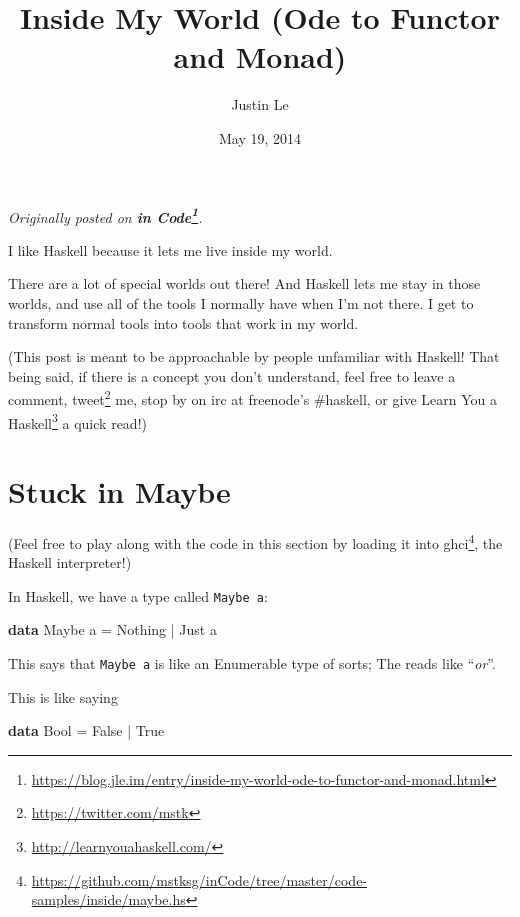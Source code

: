 \documentclass[]{article}
\title{Inside My World (Ode to Functor and Monad)}
\author{Justin Le}
\date{May 19, 2014}
\newenvironment{Shaded}{}{}
\newcommand{\KeywordTok}[1]{\textcolor[rgb]{0.00,0.44,0.13}{\textbf{{#1}}}}
\newcommand{\DataTypeTok}[1]{\textcolor[rgb]{0.56,0.13,0.00}{{#1}}}
\newcommand{\FunctionTok}[1]{\textcolor[rgb]{0.02,0.16,0.49}{{#1}}}
\newcommand{\NormalTok}[1]{{#1}}
\renewcommand{\href}[2]{#2\footnote{\url{#1}}}
\begin{document}
\maketitle

\emph{Originally posted on
\textbf{\href{https://blog.jle.im/entry/inside-my-world-ode-to-functor-and-monad.html}{in
Code}}.}

I like Haskell because it lets me live inside my world.

There are a lot of special worlds out there! And Haskell lets me stay in
those worlds, and use all of the tools I normally have when I'm not
there. I get to transform normal tools into tools that work in my world.

(This post is meant to be approachable by people unfamiliar with
Haskell! That being said, if there is a concept you don't understand,
feel free to leave a comment, \href{https://twitter.com/mstk}{tweet} me,
stop by on irc at freenode's \#haskell, or give
\href{http://learnyouahaskell.com/}{Learn You a Haskell} a quick read!)

\section{Stuck in Maybe}\label{stuck-in-maybe}

(Feel free to play along with the code in this section by
\href{https://github.com/mstksg/inCode/tree/master/code-samples/inside/maybe.hs}{loading
it into ghci}, the Haskell interpreter!)

In Haskell, we have a type called \texttt{Maybe\ a}:

\begin{Shaded}
\begin{Highlighting}[]
\KeywordTok{data} \DataTypeTok{Maybe} \NormalTok{a }\FunctionTok{=} \DataTypeTok{Nothing} \FunctionTok{|} \DataTypeTok{Just} \NormalTok{a}
\end{Highlighting}
\end{Shaded}

This says that \texttt{Maybe\ a} is like an Enumerable type of sorts;
The \texttt{\textbar{}} reads like ``\emph{or}''.

This is like saying

\begin{Shaded}
\begin{Highlighting}[]
\KeywordTok{data} \DataTypeTok{Bool} \FunctionTok{=} \DataTypeTok{False} \FunctionTok{|} \DataTypeTok{True}
\end{Highlighting}
\end{Shaded}
\end{document}
